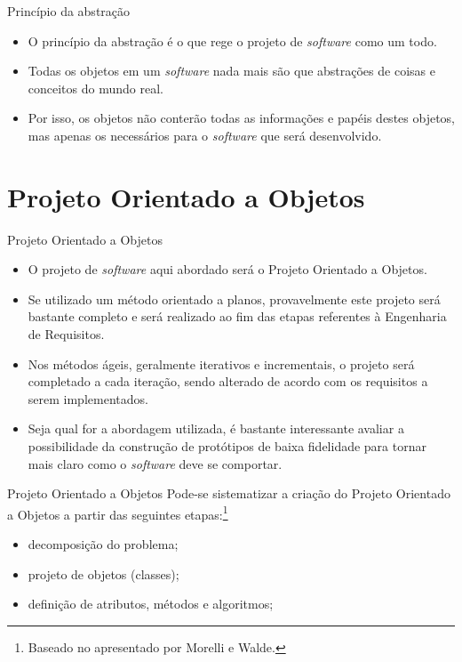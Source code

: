 \documentclass[11pt,justified]{beamer}
\begin{document}
\begin{frame}{Princípio da abstração}
    \begin{itemize}
        \item O princípio da abstração é o que rege o projeto de \textit{software} como um todo.
        \item Todas os objetos em um \textit{software} nada mais são que abstrações de coisas e conceitos do mundo real.
        \item Por isso, os objetos não conterão todas as informações e papéis destes objetos, mas apenas os necessários para o \textit{software} que será desenvolvido.
    \end{itemize}
\end{frame}

\section{Projeto Orientado a Objetos}

\begin{frame}{Projeto Orientado a Objetos}
    \begin{itemize}
        \item O projeto de \textit{software} aqui abordado será o Projeto Orientado a Objetos.
        \item Se utilizado um método orientado a planos, provavelmente este projeto será bastante completo e será realizado ao fim das etapas referentes à Engenharia de Requisitos.
        \item Nos métodos ágeis, geralmente iterativos e incrementais, o projeto será completado a cada iteração, sendo alterado de acordo com os requisitos a serem implementados.
        \item Seja qual for a abordagem utilizada, é bastante interessante avaliar a possibilidade da construção de protótipos de baixa fidelidade para tornar mais claro como o \textit{software} deve se comportar.
    \end{itemize}
\end{frame}

\begin{frame}{Projeto Orientado a Objetos}
    Pode-se sistematizar a criação do Projeto Orientado a Objetos a partir das seguintes etapas:\footnote{Baseado no apresentado por Morelli e Walde.}
    \begin{itemize}
        \item decomposição do problema;
        \item projeto de objetos (classes);
        \item definição de atributos, métodos e algoritmos;
    \end{itemize}
\end{frame}
\end{document}
